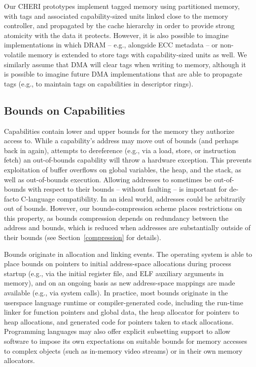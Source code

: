Our CHERI 
prototypes implement tagged memory using partitioned memory, with tags and
associated capability-sized units linked close to the memory controller, and
propagated by the cache hierarchy in order to provide strong atomicity with
the data it protects.
However, it is also possible to imagine implementations in which DRAM --
e.g., alongside ECC metadata -- or
non-volatile memory is extended to store tags with capability-sized units as
well.
We similarly assume that DMA will clear tags when writing to memory, although
it is possible to imagine future DMA implementations that are able to
propagate tags (e.g., to maintain tags on capabilities in descriptor rings).

\subsection{Bounds on Capabilities}
\label{sec:model-bounds}

Capabilities contain lower and upper bounds for the memory they authorize
access to.
While a capability's address may move out of bounds (and perhaps back in
again), attempts to dereference (e.g., via a load, store, or instruction
fetch) an out-of-bounds capability will throw a hardware exception.
This prevents exploitation of buffer overflows on global variables, the heap,
and the stack, as well as out-of-bounds execution.
Allowing addresses to sometimes be out-of-bounds with respect to their
bounds -- without faulting -- is important for de-facto C-language
compatibility.
In an ideal world, addresses could be arbitrarily out of bounds.
However, our
bounds-compression scheme places restrictions on this property, as bounds
compression depends on redundancy between the address and bounds, which is
reduced when addresses are substantially outside of their bounds (see
Section~\ref{compression} for details).

Bounds originate in allocation and linking events.
The operating system is able to place bounds on pointers to initial
address-space
allocations during process startup (e.g., via the initial register file, and
ELF auxiliary arguments in memory), and on an ongoing basis as new address-space
mappings are made available (e.g., via  system calls).
In practice, most bounds originate in the userspace language runtime or
compiler-generated
code, including the run-time linker for function pointers and global data,
the heap allocator for pointers to heap allocations, and generated code for
pointers taken to stack allocations.
 Programming languages may also offer explicit subsetting support to allow
software to impose its own expectations on suitable bounds for memory accesses
to complex objects (such as in-memory video streams) or in their own memory
allocators.


